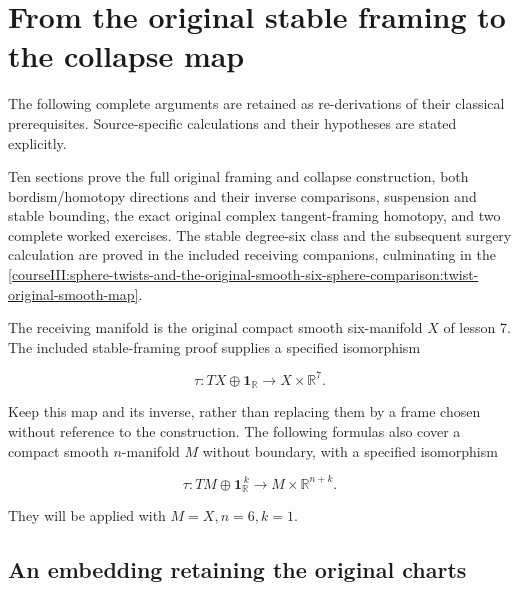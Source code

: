 \section{From the original stable framing to the collapse map}\label{courseIII:framed-manifolds-and-the-pontryagin-thom-map:section}

The following complete arguments are retained as re-derivations of their classical prerequisites. Source-specific calculations and their hypotheses are stated explicitly.

Ten sections prove the full original framing and collapse construction, both bordism/homotopy directions and their inverse comparisons, suspension and stable bounding, the exact original complex tangent-framing homotopy, and two complete worked exercises. The stable degree-six class and the subsequent surgery calculation are proved in the included receiving companions, culminating in the \cref{courseIII:sphere-twists-and-the-original-smooth-six-sphere-comparison:twist-original-smooth-map}.

The receiving manifold is the original compact smooth six-manifold \(X\) of lesson 7. The included stable-framing proof supplies a specified isomorphism

\begin{equation}
\tau:TX\oplus\mathbf1_{\mathbb R}\longrightarrow
                  X\times\mathbb R^7.
 \label{courseIII:framed-manifolds-and-the-pontryagin-thom-map:eq:1.1}
\end{equation}

Keep this map and its inverse, rather than replacing them by a frame chosen without reference to the construction. The following formulas also cover a compact smooth \(n\)-manifold \(M\) without boundary, with a specified isomorphism

\begin{equation}
\tau:TM\oplus\mathbf1_{\mathbb R}^{\,k}
            \longrightarrow M\times\mathbb R^{n+k}.
 \label{courseIII:framed-manifolds-and-the-pontryagin-thom-map:eq:1.2}
\end{equation}

They will be applied with \(M=X,n=6,k=1\).

\label{courseIII:framed-manifolds-and-the-pontryagin-thom-map:pt-original-embedding}

\subsection{An embedding retaining the original charts}
\label{courseIII:framed-manifolds-and-the-pontryagin-thom-map:section-1}


